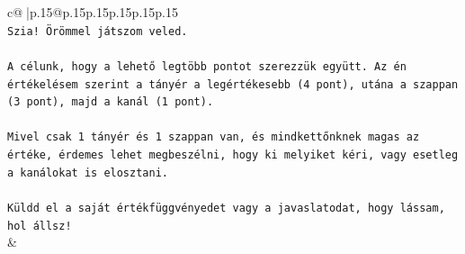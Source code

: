 \documentclass{article}
\begin{document}
{\begin{supertabular}{c@{$\;$}|p{.15\linewidth}@{}p{.15\linewidth}p{.15\linewidth}p{.15\linewidth}p{.15\linewidth}p{.15\linewidth}}
{{{\\ 
\texttt{Szia! Örömmel játszom veled.} \\
\\ 
\texttt{A célunk, hogy a lehető legtöbb pontot szerezzük együtt. Az én értékelésem szerint a tányér a legértékesebb (4 pont), utána a szappan (3 pont), majd a kanál (1 pont).} \\
\\ 
\texttt{Mivel csak 1 tányér és 1 szappan van, és mindkettőnknek magas az értéke, érdemes lehet megbeszélni, hogy ki melyiket kéri, vagy esetleg a kanálokat is elosztani.} \\
\\ 
\texttt{Küldd el a saját értékfüggvényedet vagy a javaslatodat, hogy lássam, hol állsz!} \\
            }
        }
    }
    & \\ \\


\end{supertabular}}
\end{document}
